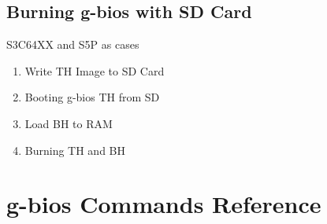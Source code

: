 \documentclass[a4paper,11pt]{book}
\begin{document}
\begin{CJK*}{UTF8}{gbsn}
\section{Burning g-bios with SD Card}
S3C64XX and S5P as cases

\begin{enumerate}
\item Write TH Image to SD Card
\item Booting g-bios TH from SD
\item Load BH to RAM
\item Burning TH and BH
\end{enumerate}

\chapter{g-bios Commands Reference}


\clearpage
\end{CJK*}
\end{document}
